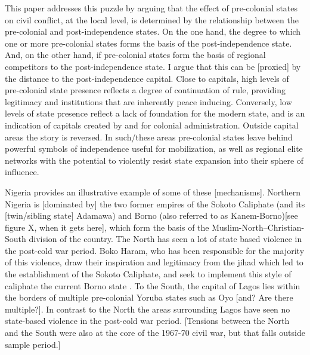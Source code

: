 \documentclass[12pt]{article}
\begin{document}
This paper addresses this puzzle by arguing that the effect of pre-colonial
states on civil conflict, at the local level, is determined by the relationship
between the pre-colonial and post-independence states. On the one hand, the
degree to which one or more pre-colonial states forms the basis of the
post-independence state. And, on the other hand, if pre-colonial states form the
basis of regional competitors to the post-independence state. I argue that this
can be [proxied] by the distance to the post-independence capital. Close to
capitals, high levels of pre-colonial state presence reflects a degree of
continuation of rule, providing legitimacy and institutions that are inherently
peace inducing. Conversely, low levels of state presence reflect a lack of
foundation for the modern state, and is an indication of capitals created by and
for colonial administration. Outside capital areas the story is reversed. In
such/these areas pre-colonial states leave behind powerful symbols of
independence useful for mobilization, as well as regional elite networks with
the potential to violently resist state expansion into their sphere of
influence.

Nigeria provides an illustrative example of some of these [mechanisms]. Northern
Nigeria is [dominated by] the two former empires of the Sokoto Caliphate (and
its [twin/sibling state] Adamawa) and Borno (also referred to as
Kanem-Borno)[see figure X, when it gets here], which form the basis of the
Muslim-North--Christian-South division of the country. The North has seen a lot
of state based violence in the post-cold war period. Boko Haram, who has been
responsible for the majority of this violence, draw their inspiration and
legitimacy from the jihad which led to the establishment of the Sokoto
Caliphate, and seek to implement this style of caliphate the current Borno state
\citep{Pieri2016}. To the South, the capital of Lagos lies within the borders of
multiple pre-colonial Yoruba states such as Oyo [and? Are there multiple?]. In
contrast to the North the areas surrounding Lagos have seen no state-based
violence in the post-cold war period. [Tensions between the North and the South
were also at the core of the 1967-70 civil war, but that falls outside sample
period.]
\end{document}
